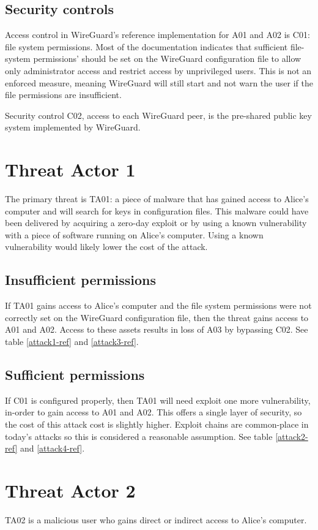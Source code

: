 \documentclass [11pt, proquest] {uwthesis}[2020/02/24]
\begin{document}
\subsection{Security controls}
Access control in WireGuard's reference implementation for A01 and A02 is C01: file system permissions. Most of the documentation indicates that sufficient file-system permissions' should be set on the WireGuard configuration file to allow only administrator access and restrict access by unprivileged users. This is not an enforced measure, meaning WireGuard will still start and not warn the user if the file permissions are insufficient. 

Security control C02, access to each WireGuard peer, is the pre-shared public key system implemented by WireGuard.

\section{Threat Actor 1}
The primary threat is TA01: a piece of malware that has gained access to Alice's computer and will search for keys in configuration files. This malware could have been delivered by acquiring a zero-day exploit or by using a known vulnerability with a piece of software running on Alice's computer. Using a known vulnerability would likely lower the cost of the attack.

\subsection{Insufficient permissions}
If TA01 gains access to Alice's computer and the file system permissions were not correctly set on the WireGuard configuration file, then the threat gains access to A01 and A02. Access to these assets results in loss of A03 by bypassing C02. 
See table \ref{attack1-ref} and \ref{attack3-ref}.

\subsection{Sufficient permissions}
If C01 is configured properly, then TA01 will need exploit one more vulnerability, in-order to gain access to A01 and A02. This offers a single layer of security, so the cost of this attack cost is slightly higher. Exploit chains are common-place in today's attacks so this is considered a reasonable assumption.  
See table \ref{attack2-ref} and \ref{attack4-ref}.

\section{Threat Actor 2}
TA02 is a malicious user who gains direct or indirect access to Alice's computer.  
\end{document}
